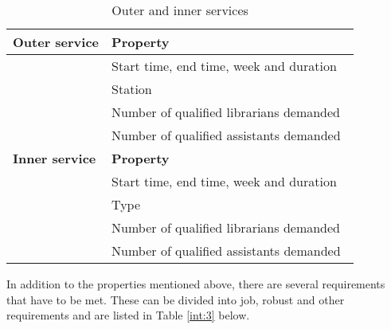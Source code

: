 \begin{table}[!h]
\caption{Outer and inner services}
\label{int:2}
\begin{tabular}{|l|l|}
\hline
\textbf{Outer service} & \textbf{Property} \\ \hline
 & Start time, end time, week and duration \
\\ \hline 
 & Station
\\ \hline 
 & Number of qualified librarians demanded
\\ \hline 
 & Number of qualified assistants demanded
\\ \hline 

\textbf{Inner service} & \textbf{Property} \\ \hline
 & Start time, end time, week and duration \
\\ \hline 
 & Type
\\ \hline 
 & Number of qualified librarians demanded
\\ \hline 
 & Number of qualified assistants demanded
\\ \hline 
\end{tabular}
\end{table}

In addition to the properties mentioned above, there are several requirements that have to be met. These can be divided into job, robust and other requirements and are listed in Table \ref{int:3} below. 


